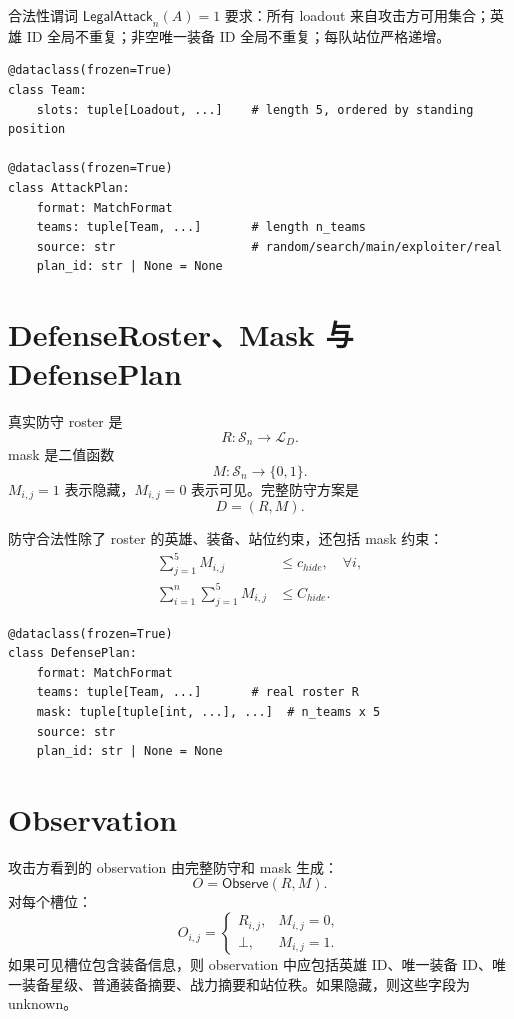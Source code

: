 \documentclass[UTF8,12pt,openany]{ctexbook}
\newcommand{\Lcal}{\mathcal{L}}
\newcommand{\Scal}{\mathcal{S}}
\newcommand{\LegalAttack}{\mathsf{LegalAttack}}
\newcommand{\Observe}{\mathsf{Observe}}
\begin{document}
合法性谓词 $\LegalAttack_n(A)=1$ 要求：所有 loadout 来自攻击方可用集合；英雄 ID 全局不重复；非空唯一装备 ID 全局不重复；每队站位严格递增。

\begin{lstlisting}[caption={AttackPlan 数据结构}]
@dataclass(frozen=True)
class Team:
    slots: tuple[Loadout, ...]    # length 5, ordered by standing position

@dataclass(frozen=True)
class AttackPlan:
    format: MatchFormat
    teams: tuple[Team, ...]       # length n_teams
    source: str                   # random/search/main/exploiter/real
    plan_id: str | None = None
\end{lstlisting}

\section{DefenseRoster、Mask 与 DefensePlan}
真实防守 roster 是
\begin{equation}
R:\Scal_n\rightarrow \Lcal_D.
\end{equation}
mask 是二值函数
\begin{equation}
M:\Scal_n\rightarrow\{0,1\}.
\end{equation}
$M_{i,j}=1$ 表示隐藏，$M_{i,j}=0$ 表示可见。完整防守方案是
\begin{equation}
D=(R,M).
\end{equation}

防守合法性除了 roster 的英雄、装备、站位约束，还包括 mask 约束：
\begin{align}
\sum_{j=1}^{5}M_{i,j} &\le c_{hide},\quad \forall i,\\
\sum_{i=1}^{n}\sum_{j=1}^{5}M_{i,j} &\le C_{hide}.
\end{align}

\begin{lstlisting}[caption={DefensePlan 数据结构}]
@dataclass(frozen=True)
class DefensePlan:
    format: MatchFormat
    teams: tuple[Team, ...]       # real roster R
    mask: tuple[tuple[int, ...], ...]  # n_teams x 5
    source: str
    plan_id: str | None = None
\end{lstlisting}

\section{Observation}
攻击方看到的 observation 由完整防守和 mask 生成：
\begin{equation}
O=\Observe(R,M).
\end{equation}
对每个槽位：
\begin{equation}
O_{i,j}=\begin{cases}
R_{i,j}, & M_{i,j}=0,\\
\bot, & M_{i,j}=1.
\end{cases}
\end{equation}
如果可见槽位包含装备信息，则 observation 中应包括英雄 ID、唯一装备 ID、唯一装备星级、普通装备摘要、战力摘要和站位秩。如果隐藏，则这些字段为 unknown。
\end{document}
